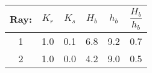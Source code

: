\begin{tabular}{cccccc}
Ray: & $K_{r}$ & $K_{s}$ & $H_{b}$ & $h_{b}$ & $\dfrac{H_{b}}{h_{b}}$ \\
\hline
1 & 1.0 & 0.1 & 6.8 & 9.2 & 0.7 \\
2 & 1.0 & 0.0 & 4.2 & 9.0 & 0.5 \\
\hline
\end{tabular}
